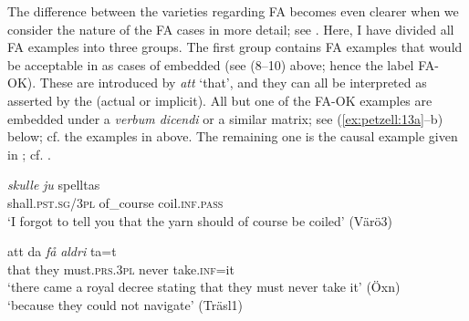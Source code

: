 \documentclass[output=paper,colorlinks,citecolor=brown,draft,draftmode]{langscibook}
\begin{document}
The difference between the varieties regarding FA becomes even clearer when we consider the nature of the FA cases in more detail; see . Here, I have divided all FA examples into three groups. The first group contains FA examples that would be acceptable in  as cases of embedded  (see (8–10) above; hence the label FA-OK). These are introduced by \textit{att} ‘that’, and they can all be interpreted as asserted by the  (actual or implicit). All but one of the FA-OK examples are embedded under a \textit{verbum dicendi} or a similar matrix; see (\ref{ex:petzell:13a}–b) below; cf. the examples in  above. The remaining one is the causal example given in ; cf. .


\ea\label{ex:petzell:13}

\gll    \textit{{skulle}} \textit{{ju}}        spelltas    \\
    shall.\textsc{pst.sg}/3\textsc{pl}  of\_course  coil.\textsc{inf}.\textsc{pass}\\
\glt `I forgot to tell you that the yarn should of course be coiled' (Värö3)  \\


\gll    att      da \textit{{få}} \textit{{aldri}} ta=t        \\
    that    they    must.\textsc{prs}.3\textsc{pl}  never    take.\textsc{inf}=it    \\
\glt `there came a royal decree stating that they must never take it’ (Öxn)    \\

\glt `because they could not navigate’ (Träsl1)
\z
\z
\end{document}

